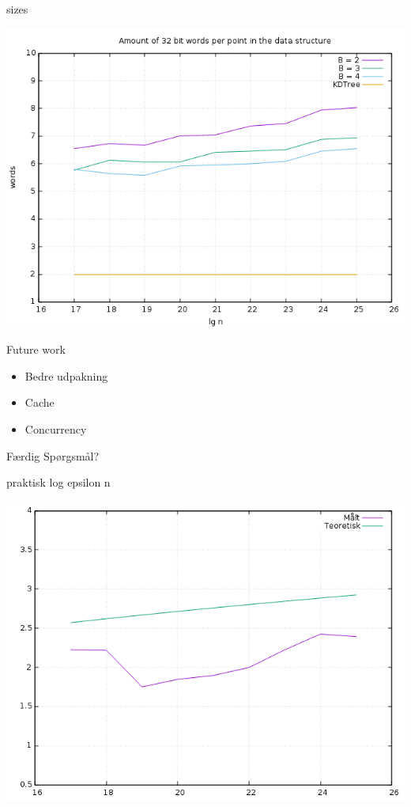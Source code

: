 \documentclass[pdf]{beamer}
\begin{document}
\begin{frame}{sizes}
  \begin{center}
    \includegraphics[scale=0.35]{pictures/analysis/sizes.png}
  \end{center}
\end{frame}

\begin{frame}{Future work}
  \begin{itemize}
    \item Bedre udpakning
    \item Cache
    \item Concurrency
  \end{itemize}
\end{frame}

\begin{frame}{Færdig}
  Spørgsmål?
\end{frame}


\begin{frame}{praktisk log epsilon n}
  \begin{center}
    \includegraphics[scale=0.35]{pictures/theory_vs_actual.png}
  \end{center}
\end{frame}
\end{document}
